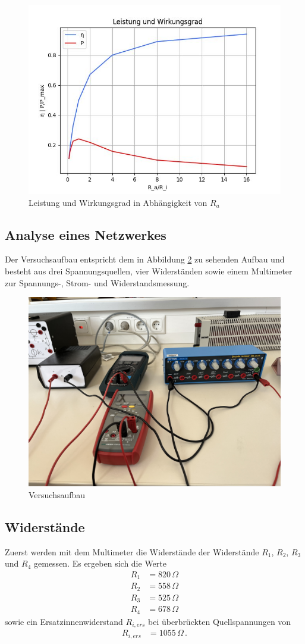\begin{figure}
    \centering
    \includegraphics[width=0.5\linewidth]{Bilder/WiderstandLeistung.jpeg}
    \caption{Leistung und Wirkungsgrad in Abhängigkeit von $R_a$}
    \label{fig:leistungWirkungsgrad}
\end{figure}

\subsection{Analyse eines Netzwerkes}
Der Versuchsaufbau entspricht dem in Abbildung \ref{fig:versuchsaufbauNetzwerk} zu sehenden Aufbau und besteht aus drei Spannungsquellen, vier Widerständen sowie einem Multimeter zur Spannungs-, Strom- und Widerstandsmessung.
\begin{figure}[ht]
    \centering
    \includegraphics[width=0.5\linewidth]{Bilder/Versuchsaufbau-Netzwerk.jpg}
    \caption{Versuchsaufbau}
    \label{fig:versuchsaufbauNetzwerk}
\end{figure}

\subsection*{Widerstände}
Zuerst werden mit dem Multimeter die Widerstände der Widerstände $R_1$, $R_2$, $R_3$ und $R_4$ gemessen. Es ergeben sich die Werte
\begin{align*}
    R_1 & = 820\,\Omega \\
    R_2 & = 558\,\Omega \\
    R_3 & = 525\,\Omega \\
    R_4 & = 678\,\Omega
\end{align*}
sowie ein Ersatzinnenwiderstand $R_{i,ers}$ bei überbrückten Quellspannungen von
\begin{align*}
    R_{i,ers} & = 1055\,\Omega\, .
\end{align*}

